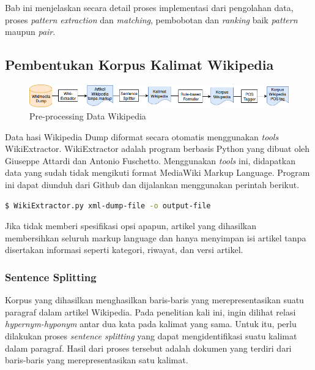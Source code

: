 \chapter{\babEmpat}
Bab ini menjelaskan secara detail proses implementasi dari pengolahan data, proses \textit{pattern extraction} dan \textit{matching}, pembobotan dan \textit{ranking} baik \textit{pattern} maupun \textit{pair}.

\section{Pembentukan Korpus Kalimat Wikipedia}
\begin{figure}
    \centering
    \includegraphics[width=\linewidth]{pics/Pic02-PreProcessingWikipedia}
    \caption{Pre-processing Data Wikipedia}
    \label{fig:preproses-wiki}
\end{figure}
Data hasi Wikipedia Dump diformat secara otomatis menggunakan \textit{tools} WikiExtractor. WikiExtractor adalah program berbasis Python yang dibuat oleh Giuseppe Attardi dan Antonio Fuschetto. Menggunakan \textit{tools} ini, didapatkan data yang sudah tidak mengikuti format MediaWiki Markup Language. Program ini dapat diunduh dari Github dan dijalankan menggunakan perintah berikut. 
\begin{lstlisting}[language=bash]
  $ WikiExtractor.py xml-dump-file -o output-file
\end{lstlisting}
Jika tidak memberi spesifikasi opsi apapun, artikel yang dihasilkan membersihkan seluruh markup language dan hanya menyimpan isi artikel tanpa disertakan informasi seperti kategori, riwayat, dan versi artikel.

\subsection{Sentence Splitting}
Korpus yang dihasilkan menghasilkan baris-baris yang merepresentasikan suatu paragraf dalam artikel Wikipedia. Pada penelitian kali ini, ingin dilihat relasi \textit{hypernym-hyponym} antar dua kata pada kalimat yang sama. Untuk itu, perlu dilakukan proses \textit{sentence splitting} yang dapat mengidentifikasi suatu kalimat dalam paragraf. Hasil dari proses tersebut adalah dokumen yang terdiri dari baris-baris yang merepresentasikan satu kalimat. 

